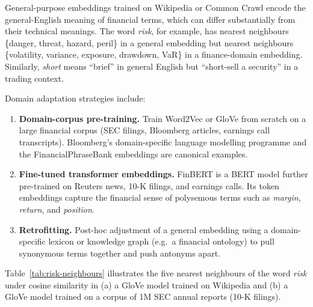\begin{deepdive}
General-purpose embeddings trained on Wikipedia or Common Crawl encode
the general-English meaning of financial terms, which can differ
substantially from their technical meanings.  The word \emph{risk}, for
example, has nearest neighbours \{danger, threat, hazard, peril\} in a
general embedding but nearest neighbours \{volatility, variance,
exposure, drawdown, VaR\} in a finance-domain embedding.  Similarly,
\emph{short} means ``brief'' in general English but ``short-sell a
security'' in a trading context.

Domain adaptation strategies include:
\begin{enumerate}
  \item \textbf{Domain-corpus pre-training.}  Train Word2Vec or GloVe
        from scratch on a large financial corpus (SEC filings, Bloomberg
        articles, earnings call transcripts).  Bloomberg's domain-specific
        language modelling programme \cite{wu2023bloomberggpt}
        and the FinancialPhraseBank embeddings \cite{malo2014phrasebank}
        are canonical examples.
  \item \textbf{Fine-tuned transformer embeddings.}  FinBERT
        \cite{yang2020finbert} %
        is a BERT model \cite{devlin2019} %
        further pre-trained on Reuters news, 10-K filings, and earnings
        calls.  Its token embeddings capture the financial sense of
        polysemous terms such as \emph{margin}, \emph{return}, and
        \emph{position}.
  \item \textbf{Retrofitting.}  Post-hoc adjustment of a general
        embedding using a domain-specific lexicon or knowledge graph
        (e.g.\ a financial ontology) to pull synonymous terms together
        and push antonyms apart.
\end{enumerate}

\begin{example}
\label{ex:risk-neighbours}
Table~\ref{tab:risk-neighbours} illustrates the five nearest neighbours
of the word \emph{risk} under cosine similarity in (a) a GloVe model
trained on Wikipedia and (b) a GloVe model trained on a corpus of 1M
SEC annual reports (10-K filings).


\end{example}
\end{deepdive}
